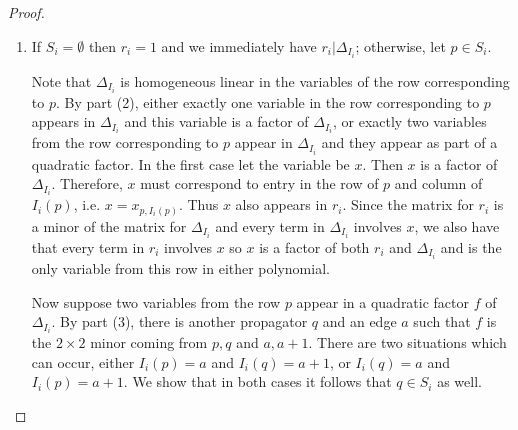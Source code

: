 \documentclass[11pt]{article}
\theoremstyle{remark}
\theoremstyle{definition}
\begin{document}
\begin{proof}
\begin{enumerate}
Now let $f$ be a quadratic factor of $\Delta_{I_i}$.  By part (2) we know that $f$ is a $2\times 2$ minor coming from two propagators, call them $p$ and $q$, and two vertices, call them $a <_i b$.  It remains to show that $b = a+1$.  From this we can conclude that $p$ and $q$ each have one end on edge $a$. 

As in the proof of part (2), make a new admissible diagram by removing the propagators which come before those contributing to $f$ in the order imposed by $I_i$.  Then without loss of generality we may assume $i=a$. The cases in the proof of part (2) show how $\Delta_{I_i}$ factors: in particular the vertices supporting the other end of $p$ either do not appear in $I_i$, or they contribute to a different factor of $\Delta_{I_i}$ than $p$ and $a$ do.  By assumption $b$ contributes to the same factor as $a$.  Therefore $(a,b)$ is an edge defining an end of $p$, that is, $b = a+1$.

\item If $S_i = \emptyset$ then $r_i = 1$ and we immediately have $r_i | \Delta_{I_i}$; otherwise, let $p\in S_i$. 

Note that $\Delta_{I_i}$ is homogeneous linear in the variables of the row corresponding to $p$.  By part (2), either exactly one variable in the row corresponding to $p$ appears in $\Delta_{I_i}$ and this variable is a factor of $\Delta_{I_i}$, or exactly two variables from the row corresponding to $p$ appear in $\Delta_{I_i}$ and they appear as part of a quadratic factor.  In the first case let the variable be $x$. Then $x$ is a factor of $\Delta_{I_i}$. Therefore, $x$ must correspond to entry in the row of $p$ and column of $I_i(p)$, i.e. $x = x_{p, I_i(p)}$. Thus $x$ also appears in $r_i$. Since the matrix for $r_i$ is a minor of the matrix for $\Delta_{I_i}$ and every term in $\Delta_{I_i}$ involves $x$, we also have that every term in $r_i$ involves $x$ so $x$ is a factor of both $r_i$ and $\Delta_{I_i}$ and is the only variable from this row in either polynomial.

  Now suppose two variables from the row $p$ appear in a quadratic factor $f$ of $\Delta_{I_i}$.  By part (3), there is another propagator $q$ and an edge $a$ such that $f$ is the $2\times 2$ minor coming from $p, q$ and $a, a+1$.  There are two situations which can occur, either $I_i(p)=a$ and $I_i(q)=a+1$, or $I_i(q)=a$ and $I_i(p)=a+1$. 
    We show that in both cases it follows that $q \in S_i$ as well.


\end{enumerate}
\end{proof}
\end{document}
